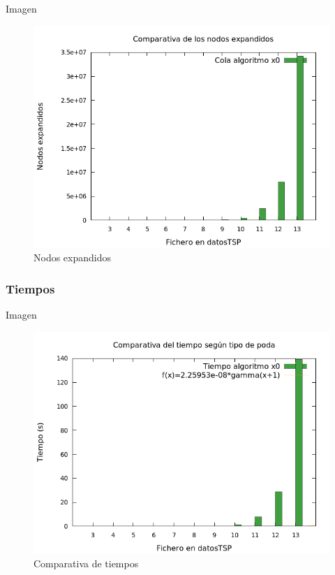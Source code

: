 \begin{frame}
	\begin{exampleblock}{Imagen}
	\begin{figure}[H]
    		\centering
	    \includegraphics[scale=0.35]{../TSP/Graficas/graficaNodos.png}
    		\caption{Nodos expandidos}
	\end{figure}
	\end{exampleblock}
\end{frame}


\subsubsection{Tiempos}
\begin{frame}
	\begin{exampleblock}{Imagen}
	\begin{figure}[H]
    		\centering
	    \includegraphics[scale=0.35]{../TSP/Graficas/graficaTiempos.png}
    		\caption{Comparativa de tiempos}
	\end{figure}
	\end{exampleblock}
\end{frame}



